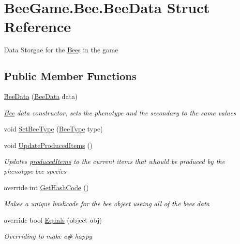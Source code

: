 \hypertarget{struct_bee_game_1_1_bee_1_1_bee_data}{}\section{Bee\+Game.\+Bee.\+Bee\+Data Struct Reference}
\label{struct_bee_game_1_1_bee_1_1_bee_data}


Data Storgae for the \hyperlink{namespace_bee_game_1_1_bee}{Bee}\textquotesingle{}s in the game  


\subsection*{Public Member Functions}
\begin{DoxyCompactItemize}
\item 
\hyperlink{struct_bee_game_1_1_bee_1_1_bee_data_ae105a46ac786f4ba927efeaf4ef02f86}{Bee\+Data} (\hyperlink{struct_bee_game_1_1_bee_1_1_bee_data}{Bee\+Data} data)
\begin{DoxyCompactList}\small\item\em \hyperlink{namespace_bee_game_1_1_bee}{Bee} data constructor, sets the phenotype and the secondary to the same values \end{DoxyCompactList}\item 
void \hyperlink{struct_bee_game_1_1_bee_1_1_bee_data_a3141a8d2ea0b8da9b88fc61dd1134b65}{Set\+Bee\+Type} (\hyperlink{namespace_bee_game_1_1_enums_a9376a1582db99d20c756e24de728944f}{Bee\+Type} type)
\item 
void \hyperlink{struct_bee_game_1_1_bee_1_1_bee_data_ae672215675ea4965bd36669043913581}{Update\+Produced\+Items} ()
\begin{DoxyCompactList}\small\item\em Updates \hyperlink{struct_bee_game_1_1_bee_1_1_bee_data_a3c49396295407e1744f501e86c32d61c}{produced\+Items} to the current items that whould be produced by the phenotype bee species \end{DoxyCompactList}\item 
override int \hyperlink{struct_bee_game_1_1_bee_1_1_bee_data_ab11b7e2d244cb0021c52ae0b839ff6c3}{Get\+Hash\+Code} ()
\begin{DoxyCompactList}\small\item\em Makes a unique hashcode for the bee object useing all of the bee\textquotesingle{}s data \end{DoxyCompactList}\item 
override bool \hyperlink{struct_bee_game_1_1_bee_1_1_bee_data_a5909cd9eb6bbe6f7f2ef348e135b6c86}{Equals} (object obj)
\begin{DoxyCompactList}\small\item\em Overriding to make c\# happy \end{DoxyCompactList}\end{DoxyCompactItemize}
